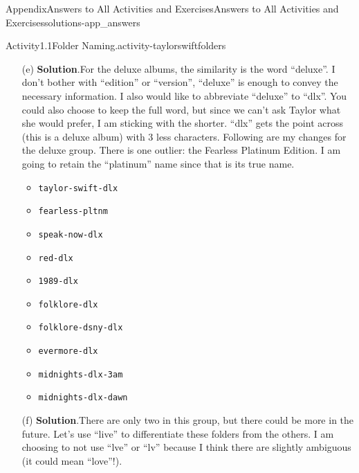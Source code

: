 \documentclass[twoside,10pt,]{book}
\newcommand{\blocktitlefont}{\relax}
\newcommand{\mono}[1]{\texttt{#1}}
\begin{document}
\begin{solutions-chapter}{Appendix}{Answers to All Activities and Exercises}{}{Answers to All Activities and Exercises}{}{}{solutions-app_answers}
\begin{activitysolution}{Activity}{1.1}{Folder Naming.}{activity-taylorswiftfolders}
\begin{enumerate}[font=\bfseries,label=(\alph*),ref=\alph*]
\begin{multicols}{2}
\begin{itemize}[label=\textbullet]
\item{}\mono{taylor-swift}%
\item{}\mono{fearless}%
\item{}\mono{speak-now}%
\item{}\mono{red}%
\item{}\mono{1989}%
\item{}\mono{reputation}%
\item{}\mono{lover}%
\item{}\mono{folklore}%
\item{}\mono{evermore}%
\item{}\mono{midnights}%
\end{itemize}
\end{multicols}
%
\item[(e)]\noindent\textbf{\blocktitlefont Solution}.\hypertarget{solution-taylorswiftfolders-h-b-back}{}\quad{}For the deluxe albums, the similarity is the word ``deluxe''. I don't bother with ``edition'' or ``version'', ``deluxe'' is enough to convey the necessary information. I also would like to abbreviate ``deluxe'' to ``dlx''. You could also choose to keep the full word, but since we can't ask Taylor what she would prefer, I am sticking with the shorter. ``dlx'' gets the point across (this is a deluxe album) with 3 less characters. Following are my changes for the deluxe group. There is one outlier: the Fearless Platinum Edition. I am going to retain the ``platinum'' name since that is its true name.%
\begin{multicols}{2}
\begin{itemize}[label=\textbullet]
\item{}\mono{taylor-swift-dlx}%
\item{}\mono{fearless-pltnm}%
\item{}\mono{speak-now-dlx}%
\item{}\mono{red-dlx}%
\item{}\mono{1989-dlx}%
\item{}\mono{folklore-dlx}%
\item{}\mono{folklore-dsny-dlx}%
\item{}\mono{evermore-dlx}%
\item{}\mono{midnights-dlx-3am}%
\item{}\mono{midnights-dlx-dawn}%
\end{itemize}
\end{multicols}
%
\item[(f)]\noindent\textbf{\blocktitlefont Solution}.\hypertarget{solution-taylorswiftfolders-i-b-back}{}\quad{}There are only two in this group, but there could be more in the future. Let's use ``live'' to differentiate these folders from the others. I am choosing to not use ``lve'' or ``lv'' because I think there are slightly ambiguous (it could mean ``love''!).%

\end{enumerate}
\end{activitysolution}
\end{solutions-chapter}
\end{document}
